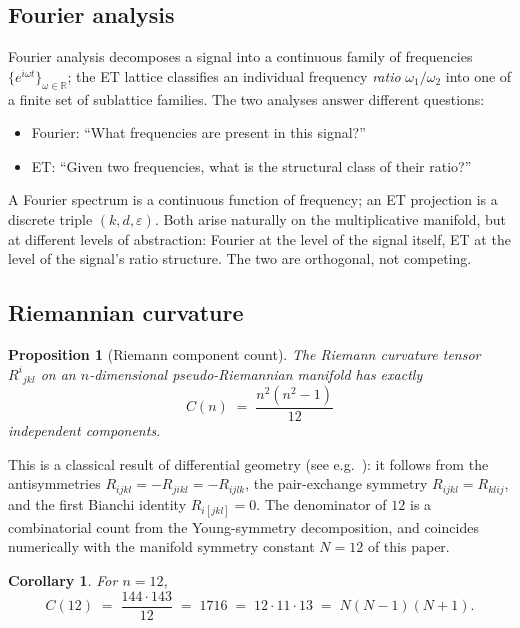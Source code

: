 \documentclass[11pt,a4paper]{article}
\newtheorem{corollary}[theorem]{Corollary}
\newtheorem{proposition}[theorem]{Proposition}
\theoremstyle{definition}
\theoremstyle{remark}
\newcommand{\R}{\mathbb{R}}
\newcommand{\eps}{\varepsilon}
\begin{document}
\subsection{Fourier analysis}

Fourier analysis decomposes a signal into a continuous family of frequencies $\{e^{i\omega t}\}_{\omega\in\R}$; the ET lattice classifies an individual frequency \emph{ratio} $\omega_{1}/\omega_{2}$ into one of a finite set of sublattice families. The two analyses answer different questions:
\begin{itemize}[leftmargin=*]
\item Fourier: ``What frequencies are present in this signal?''
\item ET: ``Given two frequencies, what is the structural class of their ratio?''
\end{itemize}

A Fourier spectrum is a continuous function of frequency; an ET projection is a discrete triple $(k,d,\eps)$. Both arise naturally on the multiplicative manifold, but at different levels of abstraction: Fourier at the level of the signal itself, ET at the level of the signal's ratio structure. The two are orthogonal, not competing.

\subsection{Riemannian curvature}

\begin{proposition}[Riemann component count]\label{prop:riemann}
The Riemann curvature tensor $R^{i}{}_{jkl}$ on an $n$-dimensional pseudo-Riemannian manifold has exactly
\[
C(n) \;=\; \frac{n^{2}(n^{2}-1)}{12}
\]
independent components.
\end{proposition}

This is a classical result of differential geometry (see e.g.~\cite{MTW}): it follows from the antisymmetries $R_{ijkl} = -R_{jikl} = -R_{ijlk}$, the pair-exchange symmetry $R_{ijkl} = R_{klij}$, and the first Bianchi identity $R_{i[jkl]} = 0$. The denominator of $12$ is a combinatorial count from the Young-symmetry decomposition, and coincides numerically with the manifold symmetry constant $N=12$ of this paper.

\begin{corollary}\label{cor:1716}
For $n=12$,
\[
C(12) \;=\; \frac{144\cdot 143}{12} \;=\; 1716 \;=\; 12\cdot 11\cdot 13 \;=\; N(N-1)(N+1).
\]
\end{corollary}
\end{document}
